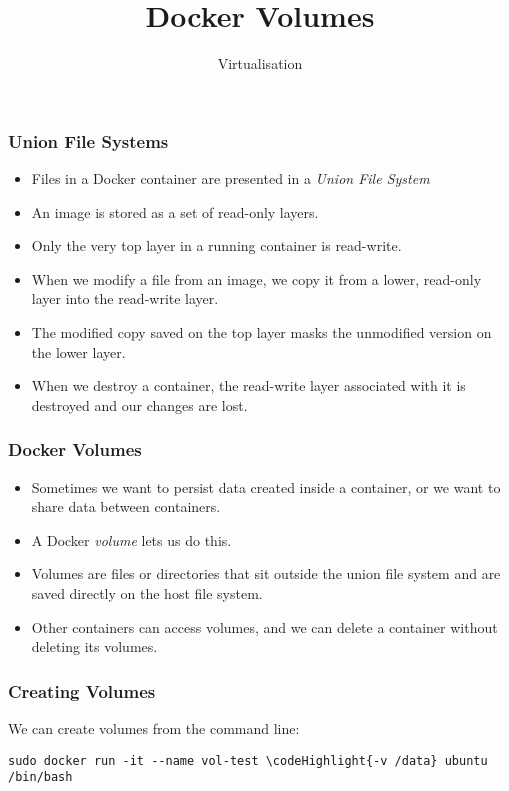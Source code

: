 \documentclass[10pt]{beamer}
\title{Docker Volumes}
\author[IN720]{Virtualisation}
\institute[Otago Polytechnic]{
  Otago Polytechnic \\
  Dunedin, New Zealand \\
}
\date{}
\newcommand\codeHighlight[1]{\textcolor[rgb]{1,0,0}{\textbf{#1}}}
\begin{document}
\begin{frame}[plain]
  \titlepage
\end{frame}


\begin{frame}
  \frametitle{Union File Systems}

 \begin{itemize}
  \item Files in a Docker container are presented in a \emph{Union File System}
  \item An image is stored as a set of read-only layers. 
  \item Only the very top layer in a running container is read-write.
  \item When we modify a file from an image, we copy it from a lower, read-only layer into the read-write layer.
  \item The modified copy saved on the top layer masks the unmodified version on the lower layer.
  \item When we destroy a container, the read-write layer associated with it is destroyed and our changes are lost.
  
  \end{itemize}
\end{frame}

\begin{frame}
	\frametitle{Docker Volumes}
	\begin{itemize}
		\item Sometimes we want to persist data created inside a container, or we want to share data between containers.
		\item A Docker \emph{volume} lets us do this.
		\item Volumes are files or directories that sit outside the union file system and are saved directly on the host file system.
		\item Other containers can access volumes, and we can delete a container without deleting its volumes.
	\end{itemize}
\end{frame}

\begin{frame}[fragile]
	\frametitle{Creating Volumes}
	We can create volumes from the command line:
	
	\begin{Verbatim}[commandchars=\\\{\}]
	sudo docker run -it --name vol-test \codeHighlight{-v /data} ubuntu /bin/bash
	\end{Verbatim}
\end{frame}
\end{document}
